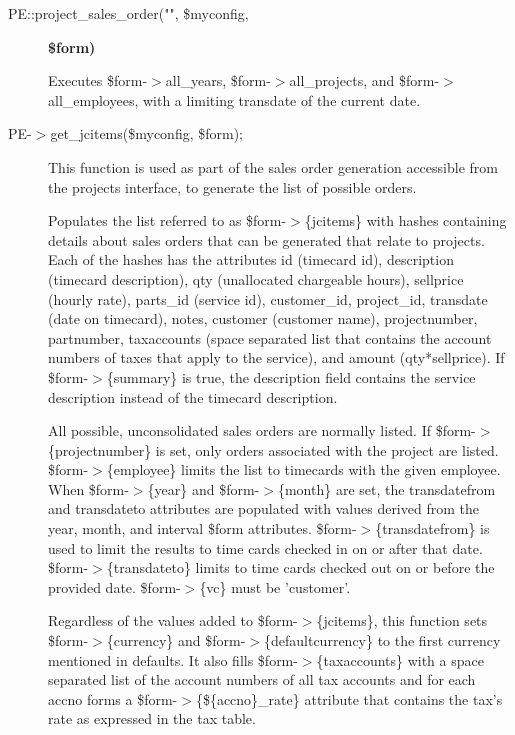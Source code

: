 \begin{description}
\begin{description}
\begin{description}
\begin{description}
\begin{description}
\begin{description}
\item[{PE::project\_sales\_order("", \$myconfig,}] \textbf{\$form)}

Executes \$form-$>$all\_years, \$form-$>$all\_projects, and \$form-$>$all\_employees, with
a limiting transdate of the current date.


\item[{PE-$>$get\_jcitems(\$myconfig, \$form);}] \mbox{}

This function is used as part of the sales order generation accessible from the
projects interface, to generate the list of possible orders.



Populates the list referred to as \$form-$>$\{jcitems\} with hashes containing
details about sales orders that can be generated that relate to projects.  Each
of the hashes has the attributes id (timecard id), description (timecard
description), qty (unallocated chargeable hours), sellprice (hourly rate),
parts\_id (service id), customer\_id, project\_id, transdate (date on timecard),
notes, customer (customer name), projectnumber, partnumber, taxaccounts (space
separated list that contains the account numbers of taxes that apply to the
service), and amount (qty*sellprice).  If \$form-$>$\{summary\} is true, the
description field contains the service description instead of the timecard
description.



All possible, unconsolidated sales orders are normally listed.  If
\$form-$>$\{projectnumber\} is set, only orders associated with the project are
listed.  \$form-$>$\{employee\} limits the list to timecards with the given employee.
When \$form-$>$\{year\} and \$form-$>$\{month\} are set, the transdatefrom and transdateto
attributes are populated with values derived from the year, month, and interval
\$form attributes.  \$form-$>$\{transdatefrom\} is used to limit the results to
time cards checked in on or after that date.  \$form-$>$\{transdateto\} limits to
time cards checked out on or before the provided date.  \$form-$>$\{vc\} must be
'customer'.



Regardless of the values added to \$form-$>$\{jcitems\}, this function sets
\$form-$>$\{currency\} and \$form-$>$\{defaultcurrency\} to the first currency mentioned
in defaults.  It also fills  \$form-$>$\{taxaccounts\} with a space separated list
of the account numbers of all tax accounts and for each accno forms a
\$form-$>$\{\$\{accno\}\_rate\} attribute that contains the tax's rate as expressed in
the tax table.




\end{description}
\end{description}
\end{description}
\end{description}
\end{description}
\end{description}
